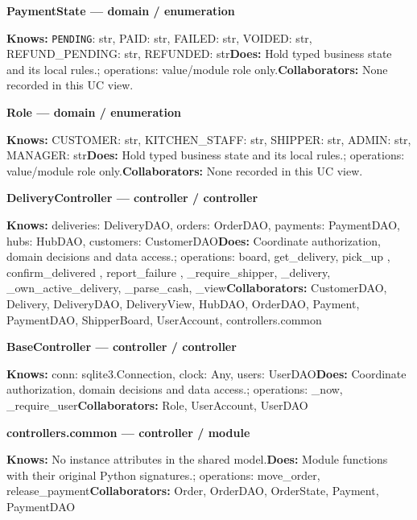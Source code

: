 \textbf{PaymentState --- domain / \guillemotleft{}enumeration\guillemotright{}}

\textbf{Knows:} \texttt{PENDING}: str, PAID: str, FAILED: str, VOIDED: str, REFUND\_PENDING: str, REFUNDED: str\newline{}\textbf{Does:} Hold typed business state and its local rules.; operations: value/module role only.\newline{}\textbf{Collaborators:} None recorded in this UC view.

\textbf{Role --- domain / \guillemotleft{}enumeration\guillemotright{}}

\textbf{Knows:} CUSTOMER: str, KITCHEN\_STAFF: str, SHIPPER: str, ADMIN: str, MANAGER: str\newline{}\textbf{Does:} Hold typed business state and its local rules.; operations: value/module role only.\newline{}\textbf{Collaborators:} None recorded in this UC view.

\textbf{DeliveryController --- controller / \guillemotleft{}controller\guillemotright{}}

\textbf{Knows:} deliveries: DeliveryDAO, orders: OrderDAO, payments: PaymentDAO, hubs: HubDAO, customers: CustomerDAO\newline{}\textbf{Does:} Coordinate authorization, domain decisions and data access.; operations: board, get\_delivery, pick\_up , confirm\_delivered , report\_failure , \_require\_shipper, \_delivery, \_own\_active\_delivery, \_parse\_cash, \_view\newline{}\textbf{Collaborators:} CustomerDAO, Delivery, DeliveryDAO, DeliveryView, HubDAO, OrderDAO, Payment, PaymentDAO, ShipperBoard, UserAccount, controllers.common

\textbf{BaseController --- controller / \guillemotleft{}controller\guillemotright{}}

\textbf{Knows:} conn: sqlite3.Connection, clock: Any, users: UserDAO\newline{}\textbf{Does:} Coordinate authorization, domain decisions and data access.; operations: \_now, \_require\_user\newline{}\textbf{Collaborators:} Role, UserAccount, UserDAO

\textbf{controllers.common --- controller / \guillemotleft{}module\guillemotright{}}

\textbf{Knows:} No instance attributes in the shared model.\newline{}\textbf{Does:} Module functions with their original Python signatures.; operations: move\_order, release\_payment\newline{}\textbf{Collaborators:} Order, OrderDAO, OrderState, Payment, PaymentDAO

